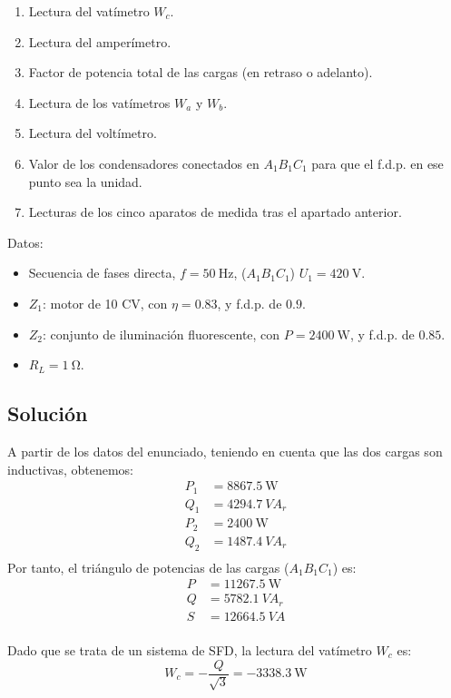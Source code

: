 \begin{enumerate}
\item Lectura del vatímetro $W_c$.
\item Lectura del amperímetro.
\item Factor de potencia total de las cargas (en retraso o
  adelanto).
\item Lectura de los vatímetros $W_a$ y $W_b$.
\item Lectura del voltímetro.
\item Valor de los condensadores conectados en $A_1B_1C_1$ para
  que el f.d.p. en ese punto sea la unidad.
\item Lecturas de los cinco aparatos de medida tras el apartado
  anterior.
\end{enumerate}

Datos:
\begin{itemize}
\item Secuencia de fases directa, $f = \SI{50}{\hertz}$, ($A_1B_1C_1$)
  $U_1 = \SI{420}{\volt}$.
\item $Z_1$: motor de 10 CV, con $\eta = 0.83$, y f.d.p. de $0.9$.
\item $Z_2$: conjunto de iluminación fluorescente, con
  $P = \SI{2400}{\watt}$, y f.d.p. de $0.85$.
\item $R_L = \SI{1}{\ohm}$.
\end{itemize}

\subsection*{Solución}

A partir de los datos del enunciado, teniendo en cuenta que las dos
cargas son inductivas, obtenemos:
\begin{align*}
  P_1 &= \SI{8867.5}{\watt}\\
  Q_1 &= \SI{4294.7}{VA}_r\\
  P_2 &= \SI{2400}{\watt}\\
  Q_2 &= \SI{1487.4}{VA}_r\\
\end{align*}
Por tanto, el triángulo de potencias de las cargas ($A_1B_1C_1$) es:
\begin{align*}
  P &= \SI{11267.5}{\watt}\\
  Q &= \SI{5782.1}{VA}_r\\
  S &= \SI{12664.5}{VA}\\
\end{align*}

Dado que se trata de un sistema de SFD, la lectura del vatímetro $W_c$
es:
\begin{equation*}
  W_c = - \frac{Q}{\sqrt{3}} = \SI{-3338.3}{\watt}
\end{equation*}

